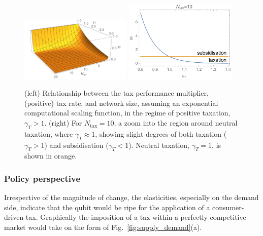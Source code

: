 \begin{figure}[!htbp]
\includegraphics[clip=true, width=0.475\textwidth]{tax_exp}
\includegraphics[clip=true, width=0.475\textwidth]{tax_subsidy}
\captionspacefig \caption{(left) Relationship between the tax performance multiplier, (positive) tax rate, and network size, assuming an exponential computational scaling function, in the regime of positive taxation, \mbox{$\gamma_T>1$}. (right) For \mbox{$N_\mathrm{tax}=10$}, a zoom into the region around neutral taxation, where \mbox{$\gamma_T\approx 1$}, showing slight degrees of both taxation (\mbox{$\gamma_T>1$}) and subsidisation (\mbox{$\gamma_T<1$}). Neutral taxation, \mbox{$\gamma_T=1$}, is shown in orange.}\label{fig:tax_exp}
\end{figure}
\fi

\subsubsection{Policy perspective}\label{sec:policy}


Irrespective of the magnitude of change, the elasticities, especially on the demand side, indicate that the qubit would be ripe for the application of a consumer-driven tax. Graphically the imposition of a tax within a perfectly competitive market would take on the form of Fig.~\ref{fig:supply_demand}(a).

